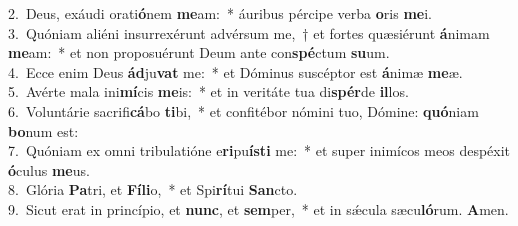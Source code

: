 {2.~}Deus, exáudi orati\textbf{ó}nem \textbf{me}am:~* áuribus pércipe verba \textbf{o}ris \textbf{me}i.\\
{3.~}Quóniam aliéni insurrexérunt advérsum me,~† et fortes quæsiérunt \textbf{á}nimam \textbf{me}am:~* et non proposuérunt Deum ante con\textbf{spé}ctum \textbf{su}um.\\
{4.~}Ecce enim Deus \textbf{ád}ju\textbf{vat} me:~* et Dóminus suscéptor est \textbf{á}nimæ \textbf{me}æ.\\
{5.~}Avérte mala ini\textbf{mí}cis \textbf{me}is:~* et in veritáte tua di\textbf{spér}de \textbf{il}los.\\
{6.~}Voluntárie sacrifi\textbf{cá}bo \textbf{ti}bi,~* et confitébor nómini tuo, Dómine: \textbf{quó}niam \textbf{bo}num est:\\
{7.~}Quóniam ex omni tribulatióne e\textbf{ri}pu\textbf{í}\textbf{sti} me:~* et super inimícos meos despéxit \textbf{ó}culus \textbf{me}us.\\
{8.~}Glória \textbf{Pa}tri, et \textbf{Fí}\textbf{li}o,~* et Spi\textbf{rí}tui \textbf{San}cto.\\
{9.~}Sicut erat in princípio, et \textbf{nunc}, et \textbf{sem}per,~* et in sǽcula sæcu\textbf{ló}rum. \textbf{A}men.\\
